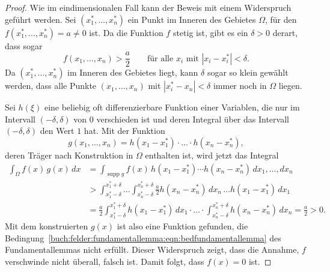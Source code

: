 \begin{proof}
Wie im eindimensionalen Fall kann der Beweis mit einem Widerspruch
geführt werden.
Sei $(x^*_1,\dots,x^*_n)$ ein Punkt im Inneren des Gebietes $\Omega$,
für den $f(x^*_1,\dots,x^*_n)=a\ne 0$ ist.
Da die Funktion $f$ stetig ist, gibt es ein $\delta>0$ derart,
dass sogar
\[
f(x_1,\dots,x_n) > \frac{a}2
\qquad\text{für alle $x_i$ mit $|x_i-x^*_i|<\delta$.}
\]
Da $(x^*_1,\dots,x^*_n)$ im Inneren des Gebietes liegt, kann 
$\delta$ sogar so klein gewählt werden, dass alle Punkte
$(x_1,\dots,x_n)$ mit $|x^*_i-x_n|<\delta$ immer noch in
$\Omega$ liegen.

Sei $h(\xi)$ eine beliebig oft differenzierbare Funktion einer Variablen,
die nur im Intervall $(-\delta,\delta)$ von $0$ verschieden ist und
deren Integral über das Intervall $(-\delta,\delta)$ den Wert $1$ hat.
Mit der Funktion
\[
g(x_1,\dots,x_n)
=
h(x_1-x^*_1)\cdot\ldots\cdot h(x_n-x^*_n),
\]
deren Träger nach Konstruktion in $\Omega$ enthalten ist, wird jetzt das
Integral
\begin{align*}
\int_{\Omega} f(x)\,g(x)\,dx
&=
\int_{\operatorname{supp} g}
f(x)\,h(x_1-x^*_1)\cdots h(x_n-x^*_n)
\,dx_1,\dots,dx_n
\\
&>
\int_{x^*_1-\delta}^{x^*_1+\delta}
\dots
\int_{x^*_n-\delta}^{x^*_n+\delta}
\frac{a}{2}
h(x_n-x^*_n) \,dx_n
\,\dots
h(x_1-x^*_1) \,dx_1
\\
&=
\frac{a}2
\int_{x^*_1-\delta}^{x^*_1+\delta}
h(x_1-x^*_1) \,dx_1
\cdot
\ldots
\cdot
\int_{x^*_n-\delta}^{x^*_n+\delta}
h(x_n-x^*_n) \,dx_n
=
\frac{a}2>0.
\end{align*}
Mit dem konstruierten $g(x)$ ist also eine Funktion gefunden, die
Bedingung~\eqref{buch:felder:fundamentallemma:eqn:bedfundamentallemma}
des Fundamentallemmas nicht erfüllt.
Dieser Widerspruch zeigt, dass die Annahme, $f$ verschwinde nicht überall,
falsch ist.
Damit folgt, dass $f(x)=0$ ist.
\end{proof}



